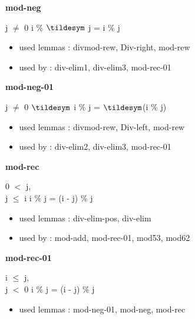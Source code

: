 \documentclass[a4paper]{article}
\begin{document}
\medskip

\bigskip

{\large\bf mod-neg}

\medskip

j $\neq$ 0 \Fol i \% $\tildesym$ j = i \% j

\begin{itemize}


\item       used lemmas  : divmod-rew, Div-right, mod-rew
\item       used by      : div-elim1, div-elim3, mod-rec-01

\end{itemize}

\medskip

\bigskip

{\large\bf mod-neg-01}

\medskip

j $\neq$ 0 \Fol $\tildesym$ i \% j = $\tildesym$(i \% j)

\begin{itemize}


\item       used lemmas  : divmod-rew, Div-left, mod-rew
\item       used by      : div-elim2, div-elim3, mod-rec-01

\end{itemize}

\medskip

\bigskip

{\large\bf mod-rec}

\medskip

0 $<$ j, \\
j $\le$ i \Fol i \% j = (i - j) \% j

\begin{itemize}


\item       used lemmas  : div-elim-pos, div-elim
\item       used by      : mod-add, mod-rec-01, mod53, mod62

\end{itemize}

\medskip

\bigskip

{\large\bf mod-rec-01}

\medskip

i $\le$ j, \\
j $<$ 0 \Fol i \% j = (i - j) \% j

\begin{itemize}


\item       used lemmas  : mod-neg-01, mod-neg, mod-rec

\end{itemize}
\end{document}
